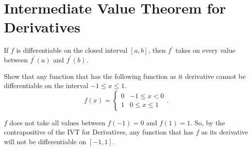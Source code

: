 \section{Intermediate Value Theorem for Derivatives}
\begin{theorem}
	If $f$ is differentiable on the closed interval $[a,b]$, then $f^\prime$ takes on every value between $f^\prime(a)$ and $f^\prime(b)$.
\end{theorem}

\begin{example}
	Show that any function that has the following function as it derivative cannot be differentiable on the interval $-1 \leq x \leq 1$.
	\begin{equation*}
		f(x) = \begin{cases}
			0 & -1 \leq x < 0 \\
			1 & 0 \leq x \leq 1
		\end{cases}.
	\end{equation*}
\end{example}
$f$ does not take all values between $f(-1)=0$ and $f(1)=1$.
So, by the contrapositive of the IVT for Derivatives, any function that has $f$ as its derivative will not be differentiable on $[-1,1]$.